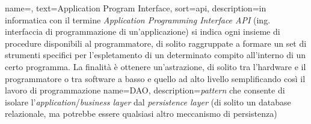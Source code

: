 
\renewcommand{\acronymname}{Acronimi e abbreviazioni}

















{
    name=,
    text=Application Program Interface,
    sort=api,
    description={in informatica con il termine \emph{Application Programming Interface API} (ing. interfaccia di programmazione di un'applicazione) si indica ogni insieme di procedure disponibili al programmatore, di solito raggruppate a formare un set di strumenti specifici per l'espletamento di un determinato compito all'interno di un certo programma. La finalità è ottenere un'astrazione, di solito tra l'hardware e il programmatore o tra software a basso e quello ad alto livello semplificando così il lavoro di programmazione}
}
{
    name=DAO,
    description={\textit{pattern} che consente di isolare l'\textit{application}/\textit{business layer} dal \textit{persistence layer} (di solito un database relazionale, ma potrebbe essere qualsiasi altro meccanismo di persistenza)}
}



